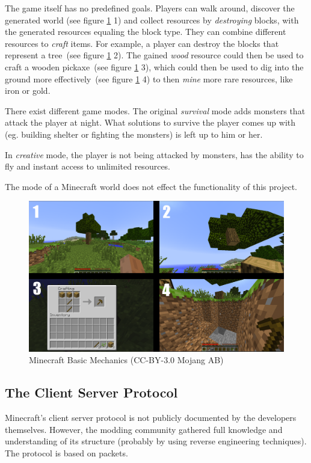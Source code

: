 The game itself has no predefined goals. Players can walk around, discover the generated world (see figure \ref{mc_mechanics} 1) and collect resources by \emph{destroying} blocks, with the generated resources equaling the block type. They can combine different resources to \emph{craft} items. For example, a player can destroy the blocks that represent a tree~(see figure \ref{mc_mechanics} 2). The gained \emph{wood} resource could then be used to craft a wooden pickaxe~(see figure \ref{mc_mechanics} 3), which could then be used to dig into the ground more effectively~(see figure \ref{mc_mechanics} 4) to then \emph{mine} more rare resources, like iron or gold.

There exist different game modes. The original \emph{survival} mode adds monsters that attack the player at night. What solutions to survive the player comes up with (eg. building shelter or fighting the monsters) is left up to him or her.

In \emph{creative} mode, the player is not being attacked by monsters, has the ability to fly and instant access to unlimited resources.

The mode of a Minecraft world does not effect the functionality of this project.

\begin{figure}[h]
  \centering
    \includegraphics[width=15cm]{graphics/minecraft_mechanics}
  \caption{Minecraft Basic Mechanics  (CC-BY-3.0 Mojang AB)}
  \label{mc_mechanics}
\end{figure}

        \subsection{The Client Server Protocol}
Minecraft's client server protocol is not publicly documented by the developers themselves. However, the modding community gathered full knowledge and understanding of its structure (probably by using reverse engineering techniques). The protocol is based on packets. 

